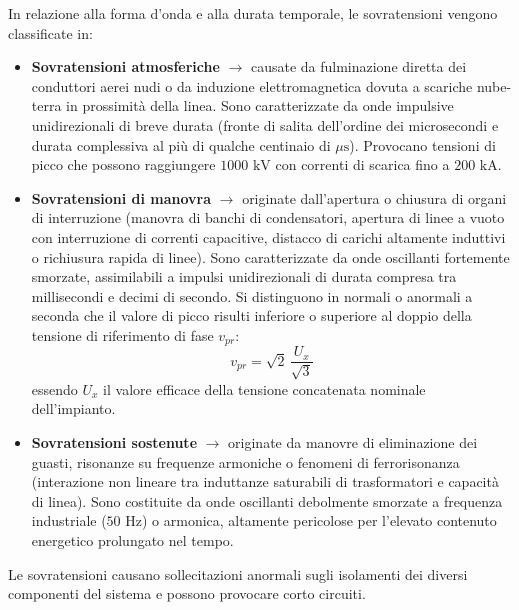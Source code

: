 In relazione alla forma d'onda e alla durata temporale, le sovratensioni vengono classificate in:
\begin{itemize}
    \item \textbf{Sovratensioni atmosferiche} $\rightarrow$ causate da fulminazione diretta dei conduttori aerei nudi o da induzione elettromagnetica dovuta a scariche nube-terra in prossimità della linea. Sono caratterizzate da onde impulsive unidirezionali di breve durata (fronte di salita dell'ordine dei microsecondi e durata complessiva al più di qualche centinaio di $\mu\text{s}$). Provocano tensioni di picco che possono raggiungere $1000\text{ kV}$ con correnti di scarica fino a $200\text{ kA}$.
    \item \textbf{Sovratensioni di manovra} $\rightarrow$ originate dall'apertura o chiusura di organi di interruzione (manovra di banchi di condensatori, apertura di linee a vuoto con interruzione di correnti capacitive, distacco di carichi altamente induttivi o richiusura rapida di linee). Sono caratterizzate da onde oscillanti fortemente smorzate, assimilabili a impulsi unidirezionali di durata compresa tra millisecondi e decimi di secondo. Si distinguono in normali o anormali a seconda che il valore di picco risulti inferiore o superiore al doppio della tensione di riferimento di fase $v_{pr}$:
    \[v_{pr} = \sqrt{2} \, \frac{U_x}{\sqrt{3}}\]
    essendo $U_x$ il valore efficace della tensione concatenata nominale dell'impianto.
    \item \textbf{Sovratensioni sostenute} $\rightarrow$ originate da manovre di eliminazione dei guasti, risonanze su frequenze armoniche o fenomeni di ferrorisonanza (interazione non lineare tra induttanze saturabili di trasformatori e capacità di linea). Sono costituite da onde oscillanti debolmente smorzate a frequenza industriale ($50\text{ Hz}$) o armonica, altamente pericolose per l'elevato contenuto energetico prolungato nel tempo.
\end{itemize}

\newpage
Le sovratensioni causano sollecitazioni anormali sugli isolamenti dei diversi componenti del sistema e
possono provocare corto circuiti.

